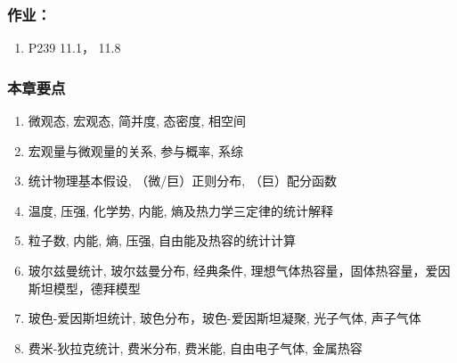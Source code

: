 \begin{frame}[label=current]
  \frametitle{作业：}
\begin{enumerate}
  \item P239 11.1， 11.8
\end{enumerate}
\end{frame} 

\begin{frame}[label=current]
  \frametitle{本章要点}
  \begin{enumerate}
    \item 微观态, 宏观态, 简并度, 态密度, 相空间
    \item 宏观量与微观量的关系, 参与概率, 系综
    \item 统计物理基本假设, （微/巨）正则分布, （巨）配分函数
    \item 温度, 压强, 化学势, 内能, 熵及热力学三定律的统计解释
    \item 粒子数, 内能, 熵, 压强, 自由能及热容的统计计算
    \item 玻尔兹曼统计, 玻尔兹曼分布, 经典条件, 理想气体热容量，固体热容量，爱因斯坦模型，德拜模型 
    \item 玻色-爱因斯坦统计, 玻色分布，玻色-爱因斯坦凝聚, 光子气体, 声子气体
    \item 费米-狄拉克统计, 费米分布, 费米能, 自由电子气体, 金属热容
  \end{enumerate}

\end{frame} 